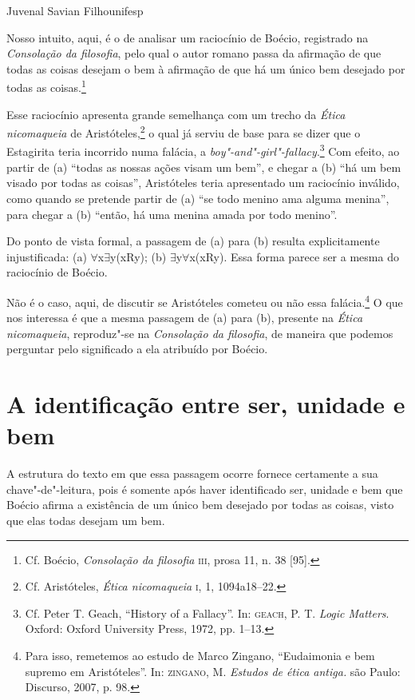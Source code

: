 %
	{Juvenal Savian Filho}{unifesp}


Nosso intuito, aqui, é o de analisar um raciocínio de Boécio,
registrado na \emph{Consolação da filosofia}, pelo qual o
autor romano passa da afirmação de que todas as coisas desejam o
bem à afirmação de que há um único bem desejado por todas as
coisas.\footnote{ Cf. Boécio, \emph{Consolação da filosofia}
\textsc{iii}, prosa 11, n. 38 [95].}

Esse raciocínio apresenta grande semelhança com um trecho da
\emph{Ética nicomaqueia} de Aristóteles,\footnote{ Cf.
Aristóteles, \emph{Ética nicomaqueia} \textsc{i}, 1, 1094a18--22.} o
qual já serviu de base para se dizer que o Estagirita teria
incorrido numa falácia, a
\emph{boy"-and"-girl"-fallacy}.\footnote{ Cf. Peter T. Geach,
“History of a Fallacy”. In: \textsc{geach}, P. T. \emph{Logic Matters}.
Oxford: Oxford University Press, 1972, pp. 1--13.} Com efeito,
ao partir de (a) “todas as nossas ações visam um bem”, e chegar
a (b) “há um bem visado por todas as coisas”, Aristóteles teria
apresentado um raciocínio inválido, como quando se pretende
partir de (a) “se todo menino ama alguma menina”, para chegar a
(b) “então, há uma menina amada por todo menino”.

Do ponto de vista formal, a passagem de (a) para (b) resulta
explicitamente injustificada: (a) ${\forall}$x${\exists}$y(xRy);
(b) ${\exists}$y${\forall}$x(xRy). Essa forma parece ser a mesma
do raciocínio de Boécio.

Não é o caso, aqui, de discutir se Aristóteles cometeu ou não
essa falácia.\footnote{ Para isso, remetemos ao estudo de Marco
Zingano, “Eudaimonia e bem supremo em Aristóteles”. In:
\textsc{zingano},
M. \emph{Estudos de ética antiga.} são Paulo: Discurso, 2007,
p. 98.} O que nos interessa é que a mesma passagem de (a) para
(b), presente na \emph{Ética nicomaqueia}, reproduz"-se na
\emph{Consolação da filosofia}, de maneira que podemos
perguntar pelo significado a ela atribuído por Boécio.

\section{A identificação entre ser, unidade e bem}

A estrutura do texto em que essa passagem ocorre fornece
certamente a sua chave"-de"-leitura, pois é somente após haver
identificado ser, unidade e bem que Boécio afirma a existência
de um único bem desejado por todas as coisas, visto que elas
todas desejam um bem.

